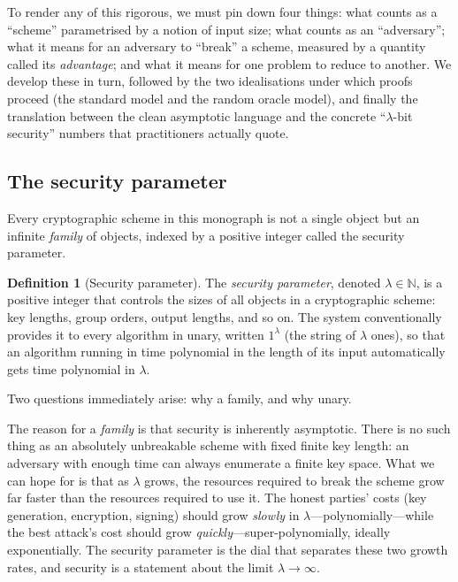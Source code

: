 \documentclass[11pt,a4paper]{article}
\theoremstyle{definition}
\newtheorem{definition}[theorem]{Definition}
\theoremstyle{remark}
\newcommand{\N}{\ensuremath{\mathbb{N}}}
\begin{document}
To render any of this rigorous, we must pin down four things: what counts as a
``scheme'' parametrised by a notion of input size; what counts as an
``adversary''; what it means for an adversary to ``break'' a scheme, measured by
a quantity called its \emph{advantage}; and what it means for one problem to
reduce to another. We develop these in turn, followed by the two idealisations
under which proofs proceed (the standard model and the random oracle
model), and finally the translation between the clean asymptotic language and
the concrete ``\(\lambda\)-bit security'' numbers that practitioners actually
quote.

\subsection{The security parameter}\label{model:subsec:secparam}

Every cryptographic scheme in this monograph is not a single object but an
infinite \emph{family} of objects, indexed by a positive integer called the
security parameter.

\begin{definition}[Security parameter]\label{model:def:secparam}
The \emph{security parameter}, denoted \(\lambda \in \N\), is a positive integer
that controls the sizes of all objects in a cryptographic scheme: key lengths,
group orders, output lengths, and so on. The system conventionally provides it to every
algorithm in unary, written \(1^\lambda\) (the string of \(\lambda\)
ones), so that an algorithm running in time polynomial in the length of its
input automatically gets time polynomial in \(\lambda\).
\end{definition}

Two questions immediately arise: why a family, and why unary.

The reason for a \emph{family} is that security is inherently asymptotic. There
is no such thing as an absolutely unbreakable scheme with fixed finite key
length: an adversary with enough time can always enumerate a finite key space.
What we can hope for is that as \(\lambda\) grows, the resources required to break
the scheme grow far faster than the resources required to use it. The honest
parties' costs (key generation, encryption, signing) should grow \emph{slowly}
in \(\lambda\)---polynomially---while the best attack's cost should grow
\emph{quickly}---super-polynomially, ideally exponentially. The security
parameter is the dial that separates these two growth rates, and security is a
statement about the limit \(\lambda \to \infty\).
\end{document}
